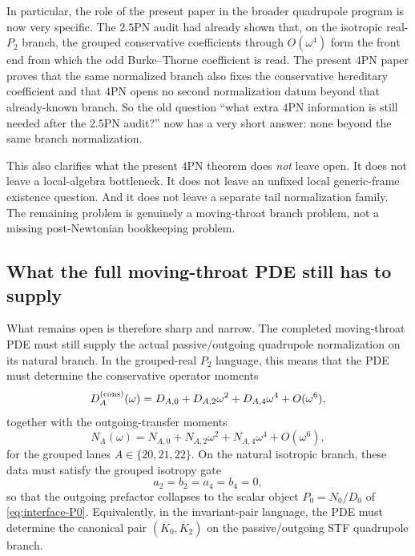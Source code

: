 \documentclass[11pt]{article}
\begin{document}
In particular, the role of the present paper in the broader quadrupole program
is now very specific.  The $2.5$PN audit had already shown that, on the
isotropic real-$P_2$ branch, the grouped conservative coefficients through
$O(\omega^4)$ form the front end from which the odd Burke--Thorne coefficient is
read.  The present $4$PN paper proves that the same normalized branch also fixes
the conservative hereditary coefficient and that $4$PN opens no second
normalization datum beyond that already-known branch.  So the old question
``what extra $4$PN information is still needed after the $2.5$PN audit?'' now
has a very short answer: none beyond the same branch normalization.

This also clarifies what the present $4$PN theorem does \emph{not} leave open.
It does not leave a local-algebra bottleneck.  It does not leave an unfixed
local generic-frame existence question.  And it does not leave a separate tail
normalization family.  The remaining problem is genuinely a moving-throat branch
problem, not a missing post-Newtonian bookkeeping problem.

\subsection{What the full moving-throat PDE still has to supply}
\label{sec:interface-pde-still-open}

What remains open is therefore sharp and narrow.  The completed moving-throat
PDE must still supply the actual passive/outgoing quadrupole normalization on
its natural branch.  In the grouped-real $P_2$ language, this means that the PDE
must determine the conservative operator moments
\begin{equation}
D_A^{\rm(cons)}(\omega)
=
D_{A,0}+D_{A,2}\omega^2+D_{A,4}\omega^4+O(\omega^6),
\label{eq:interface-grouped-operator}
\end{equation}
together with the outgoing-transfer moments
\begin{equation}
N_A(\omega)
=
N_{A,0}+N_{A,2}\omega^2+N_{A,4}\omega^4+O(\omega^6),
\label{eq:interface-grouped-transfer}
\end{equation}
for the grouped lanes $A\in\{20,21,22\}$.  On the natural isotropic branch,
these data must satisfy the grouped isotropy gate
\begin{equation}
a_2=b_2=a_4=b_4=0,
\label{eq:interface-isotropy-gate}
\end{equation}
so that the outgoing prefactor collapses to the scalar object $P_0=N_0/D_0$ of
\eqref{eq:interface-P0}.  Equivalently, in the invariant-pair language, the PDE
must determine the canonical pair $(\overline K_0,\overline K_2)$ on the
passive/outgoing STF quadrupole branch.
\end{document}
